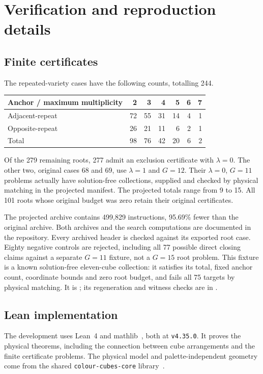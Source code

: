 \documentclass[11pt]{article}
\theoremstyle{remark}
\begin{document}
\section{Verification and reproduction details}\label{app:verification}
\subsection{Finite certificates}
The repeated-variety cases have the following counts,
totalling 244.
\begin{center}
\begin{tabular}{lrrrrrr}
\toprule
Anchor / maximum multiplicity & 2 & 3 & 4 & 5 & 6 & 7\\
\midrule
Adjacent-repeat & 72 & 55 & 31 & 14 & 4 & 1\\
Opposite-repeat & 26 & 21 & 11 & 6 & 2 & 1\\
Total & 98 & 76 & 42 & 20 & 6 & 2\\
\bottomrule
\end{tabular}
\end{center}

Of the 279 remaining roots, 277 admit an exclusion certificate with $\lambda=0$. The other two, original
cases 68 and 69, use $\lambda=1$ and $G=12$. Their $\lambda=0$, $G=11$ problems actually
have solution-free collections, supplied and checked by physical matching in
the projected manifest. The projected totals range from 9 to 15. All 101 roots
whose original budget was zero retain their original certificates.

The projected archive contains 499,829 instructions, 95.69\% fewer than the
original archive. Both archives and the search computations are documented
in the repository.
Every archived header is checked against its exported root case. Eighty
negative controls are rejected, including all 77 possible direct closing
claims against a separate $G=11$ fixture, not a $G=15$ root problem.
This fixture is a known solution-free eleven-cube collection: it satisfies
its total, fixed anchor count, coordinate bounds and zero root budget, and
fails all 75 targets by physical matching. It is ; its regeneration and witness
checks are in .

\subsection{Lean implementation}
The development uses Lean~4 and mathlib~\cite{Lean4,mathlib}, both at
\texttt{v4.35.0}. It proves the physical theorems, including the connection
between cube arrangements and the finite certificate problems.
The physical model and palette-independent geometry come from the shared
\texttt{colour-\allowbreak cubes-\allowbreak core} library~\cite{ColourCubes}.
\end{document}
